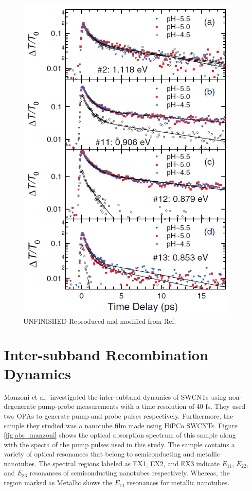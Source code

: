 \begin{figure}[ht]
	\centering
	\includegraphics[scale=0.55]{images/chapter_prior_works/dtt_ph_gordana}
	\caption{{\color{red} UNFINISHED } Reproduced and modified from Ref.\ \cite{ostojic2004interband}}
	\label{fig:dtt_ph_gordana}
\end{figure}


\section{Inter-subband Recombination Dynamics}
Manzoni et al.\ investigated the inter-subband dynamics of SWCNTs using non-degenerate pump-probe measurements with a time resolution of 40 fs. They used two OPAs to generate pump and probe pulses respectively. Furthermore, the sample they studied was a nanotube film made using HiPCo SWCNTs. Figure \ref{fig:abs_manzoni} shows the optical absorption spectrum of this sample along with the specta of the pump pulses used in this study. The sample contains a variety of optical resonances that belong to semiconducting and metallic nanotubes. The spectral regions labeled as EX1, EX2, and EX3 indicate $E_{11}$, $E_{22}$, and $E_{33}$ resonances of semiconducting nanotubes respectively. Whereas, the region marked as Metallic shows the $E_{11}$ resonances for metallic nanotubes.

